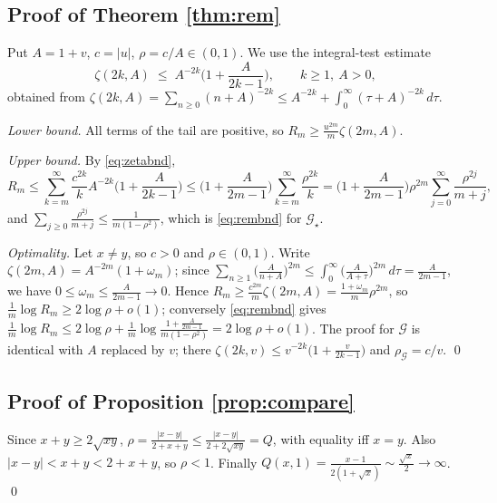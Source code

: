 \documentclass[11pt,a4paper]{amsart}
\theoremstyle{definition}
\newcommand{\Gg}{\mathcal{G}}
\newcommand{\Gs}{\mathcal{G}_{\star}}
\begin{document}
\subsection{Proof of Theorem \ref{thm:rem}}
Put $A=1+v$, $c=|u|$, $\rho=c/A\in(0,1)$. We use the integral-test estimate
\begin{equation}\label{eq:zetabnd}
  \zeta(2k,A)\;\le\;A^{-2k}\Big(1+\frac{A}{2k-1}\Big),\qquad k\ge1,\ A>0,
\end{equation}
obtained from
$\zeta(2k,A)=\sum_{n\ge0}(n+A)^{-2k}\le A^{-2k}+\int_{0}^{\infty}(\tau+A)^{-2k}\,d\tau$.

\emph{Lower bound.} All terms of the tail are positive, so
$R_m\ge\frac{u^{2m}}{m}\zeta(2m,A)$.

\emph{Upper bound.} By \eqref{eq:zetabnd},
\[
  R_m\le\sum_{k=m}^{\infty}\frac{c^{2k}}{k}A^{-2k}\Big(1+\frac{A}{2k-1}\Big)
   \le\Big(1+\frac{A}{2m-1}\Big)\sum_{k=m}^{\infty}\frac{\rho^{2k}}{k}
   =\Big(1+\frac{A}{2m-1}\Big)\rho^{2m}\sum_{j=0}^{\infty}\frac{\rho^{2j}}{m+j},
\]
and $\sum_{j\ge0}\frac{\rho^{2j}}{m+j}\le\frac{1}{m(1-\rho^{2})}$, which is
\eqref{eq:rembnd} for $\Gs$.

\emph{Optimality.} Let $x\ne y$, so $c>0$ and $\rho\in(0,1)$. Write
$\zeta(2m,A)=A^{-2m}(1+\omega_m)$; since
$\sum_{n\ge1}\big(\frac{A}{n+A}\big)^{2m}
\le\int_0^{\infty}\big(\frac{A}{A+\tau}\big)^{2m}\,d\tau
=\frac{A}{2m-1}$, we have $0\le\omega_m\le\frac{A}{2m-1}\to0$. Hence
$R_m\ge\frac{c^{2m}}{m}\zeta(2m,A)=\frac{1+\omega_m}{m}\rho^{2m}$, so
$\frac1m\log R_m\ge2\log\rho+o(1)$; conversely \eqref{eq:rembnd} gives
$\frac1m\log R_m\le2\log\rho+\frac1m\log\frac{1+\frac{A}{2m-1}}{m(1-\rho^{2})}
=2\log\rho+o(1)$. The proof for $\Gg$ is identical with $A$ replaced by $v$; there
$\zeta(2k,v)\le v^{-2k}\big(1+\frac{v}{2k-1}\big)$ and $\rho_{\Gg}=c/v$. \qed

\subsection{Proof of Proposition \ref{prop:compare}}
Since $x+y\ge2\sqrt{xy}$, $\rho=\frac{|x-y|}{2+x+y}\le\frac{|x-y|}{2+2\sqrt{xy}}=Q$, with
equality iff $x=y$. Also $|x-y|<x+y<2+x+y$, so $\rho<1$. Finally
$Q(x,1)=\frac{x-1}{2(1+\sqrt x)}\sim\frac{\sqrt x}{2}\to\infty$. \qed
\end{document}
